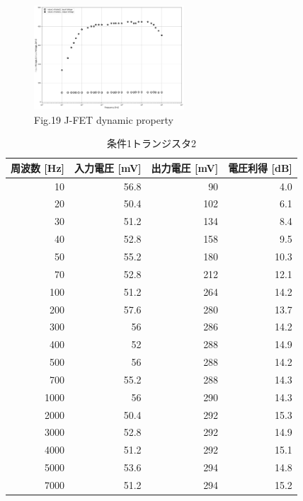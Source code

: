 \documentclass[a4paper,11pt,xelatex,ja=standard]{bxjsarticle}
\begin{document}
        \begin{figure}[H]
            \centering
            \includegraphics[width=0.5\textwidth]{./img/4/pic-2.png}
            \caption{Fig.19  J-FET dynamic property}
        \end{figure}

        \begin{table}[H]
            \centering
            \caption{条件1トランジスタ2}
            \begin{tabular}{rrrr}
                \hline
                周波数 [Hz] & 入力電圧 [mV] & 出力電圧 [mV] & 電圧利得 [dB] \\
                \hline\hline
                10 & 56.8 & 90 & 4.0 \\
                20 & 50.4 & 102 & 6.1 \\
                30 & 51.2 & 134 & 8.4 \\
                40 & 52.8 & 158 & 9.5 \\
                50 & 55.2 & 180 & 10.3 \\
                70 & 52.8 & 212 & 12.1 \\
                100 & 51.2 & 264 & 14.2 \\
                200 & 57.6 & 280 & 13.7 \\
                300 & 56 & 286 & 14.2 \\
                400 & 52 & 288 & 14.9 \\
                500 & 56 & 288 & 14.2 \\
                700 & 55.2 & 288 & 14.3 \\
                1000 & 56 & 290 & 14.3 \\
                2000 & 50.4 & 292 & 15.3 \\
                3000 & 52.8 & 292 & 14.9 \\
                4000 & 51.2 & 292 & 15.1 \\
                5000 & 53.6 & 294 & 14.8 \\
                7000 & 51.2 & 294 & 15.2 \\

\end{tabular}
\end{table}
\end{document}
